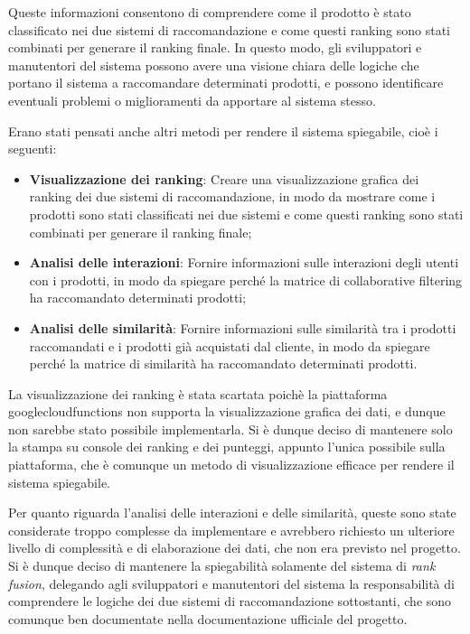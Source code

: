 Queste informazioni consentono di comprendere come il prodotto è stato classificato nei due sistemi di raccomandazione e come questi ranking sono stati combinati per generare il ranking finale. In questo modo, gli sviluppatori e manutentori del sistema possono avere una visione chiara delle logiche che portano il sistema a raccomandare determinati prodotti, e possono identificare eventuali problemi o miglioramenti da apportare al sistema stesso.

Erano stati pensati anche altri metodi per rendere il sistema spiegabile, cioè i seguenti:
\begin{itemize}
    \item \textbf{Visualizzazione dei ranking}: Creare una visualizzazione grafica dei ranking dei due sistemi di raccomandazione, in modo da mostrare come i prodotti sono stati classificati nei due sistemi e come questi ranking sono stati combinati per generare il ranking finale;
    \item \textbf{Analisi delle interazioni}: Fornire informazioni sulle interazioni degli utenti con i prodotti, in modo da spiegare perché la matrice di collaborative filtering ha raccomandato determinati prodotti;
    \item \textbf{Analisi delle similarità}: Fornire informazioni sulle similarità tra i prodotti raccomandati e i prodotti già acquistati dal cliente, in modo da spiegare perché la matrice di similarità ha raccomandato determinati prodotti.
\end{itemize}

La visualizzazione dei ranking è stata scartata poichè la piattaforma \gls{googlecloudfunctions} non supporta la visualizzazione grafica dei dati, e dunque non sarebbe stato possibile implementarla. Si è dunque deciso di mantenere solo la stampa su console dei ranking e dei punteggi, appunto l'unica possibile sulla piattaforma, che è comunque un metodo di visualizzazione efficace per rendere il sistema spiegabile.

Per quanto riguarda l'analisi delle interazioni e delle similarità, queste sono state considerate troppo complesse da implementare e avrebbero richiesto un ulteriore livello di complessità e di elaborazione dei dati, che non era previsto nel progetto.
Si è dunque deciso di mantenere la spiegabilità solamente del sistema di \emph{rank fusion}, delegando agli sviluppatori e manutentori del sistema la responsabilità di comprendere le logiche dei due sistemi di raccomandazione sottostanti, che sono comunque ben documentate nella documentazione ufficiale del progetto.
